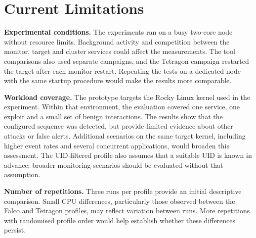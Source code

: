 
\section{Current Limitations}
  \label{sec:evaluation-threats-validity}

  \noindent\textbf{Experimental conditions.}
  The experiments ran on a busy two-core node without resource limits.
  Background activity and competition between the monitor, target and cluster
  services could affect the measurements. The tool comparisons also used
  separate campaigns, and the Tetragon campaign restarted the target after
  each monitor restart. Repeating the tests on a dedicated node with the
  same startup procedure would make the results more comparable.

  \medskip
  \noindent\textbf{Workload coverage.}
  The prototype targets the Rocky Linux kernel used in the experiment.
  Within that environment, the evaluation covered one service, one exploit
  and a small set of benign interactions. The results show that the
  configured sequence was detected, but provide limited evidence about
  other attacks or false alerts. Additional scenarios on the same target
  kernel, including higher event rates and several concurrent applications,
  would broaden this assessment. The UID-filtered profile also assumes
  that a suitable UID is known in advance; broader monitoring scenarios
  should be evaluated without that assumption.

  \medskip
  \noindent\textbf{Number of repetitions.}
  Three runs per profile provide an initial descriptive comparison.
  Small CPU differences, particularly those observed between the Falco
  and Tetragon profiles, may reflect variation between runs.
  More repetitions with randomised profile order would help establish
  whether these differences persist.
  
%
%
